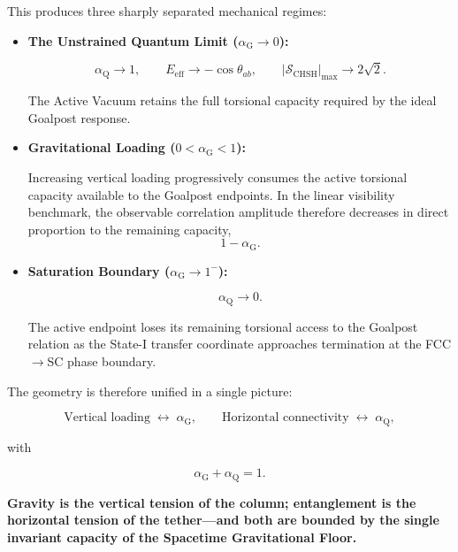 This produces three sharply separated mechanical regimes:

\begin{itemize}

    \item \textbf{The Unstrained Quantum Limit ($\alpha_{\mathrm G}\to0$):}

    \begin{equation}
        \alpha_{\mathrm Q}\to1,
        \qquad
        E_{\mathrm{eff}}\to-\cos\theta_{ab},
        \qquad
        |\mathcal S_{\mathrm{CHSH}}|_{\max}\to2\sqrt2.
    \end{equation}

    The Active Vacuum retains the full torsional capacity required by the ideal Goalpost response.

    \item \textbf{Gravitational Loading ($0<\alpha_{\mathrm G}<1$):}

    Increasing vertical loading progressively consumes the active torsional capacity available to the Goalpost endpoints. In the linear visibility benchmark, the observable correlation amplitude therefore decreases in direct proportion to the remaining capacity,
    \begin{equation}
        1-\alpha_{\mathrm G}.
    \end{equation}

    \item \textbf{Saturation Boundary ($\alpha_{\mathrm G}\to1^{-}$):}

    \begin{equation}
        \alpha_{\mathrm Q}\to0.
    \end{equation}

    The active endpoint loses its remaining torsional access to the Goalpost relation as the State-I transfer coordinate approaches termination at the FCC$\rightarrow$SC phase boundary.

\end{itemize}

The geometry is therefore unified in a single picture:

\begin{equation}
    \text{Vertical loading}
    \;\longleftrightarrow\;
    \alpha_{\mathrm G},
    \qquad
    \text{Horizontal connectivity}
    \;\longleftrightarrow\;
    \alpha_{\mathrm Q},
\end{equation}

with

\begin{equation}
    \alpha_{\mathrm G}
    +
    \alpha_{\mathrm Q}
    =
    1.
\end{equation}

\textbf{Gravity is the vertical tension of the column; entanglement is the horizontal tension of the tether---and both are bounded by the single invariant capacity of the Spacetime Gravitational Floor.}
